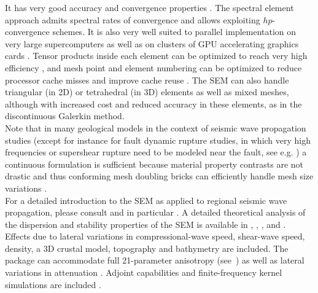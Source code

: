 It has very good accuracy and convergence properties \citep{MaPa89,SePr94,DeFiMu02,Coh02,DeSe07,SeOl08,AiWa09,AiWa10,MeStTh12}.
The spectral element approach admits spectral rates of convergence
and allows exploiting $hp$-convergence schemes. It is also very well
suited to parallel implementation on very large supercomputers \citep{KoTsChTr03,TsKoChTr03,KoLaMi08a,CaKoLaTiMiLeSnTr08,KoViCh10}
as well as on clusters of GPU accelerating graphics cards \citep{Kom11,MiKo10,KoMiEr09,KoErGoMi10}.
Tensor products inside each element can be optimized to reach very
high efficiency \citep{DeFiMu02}, and mesh point and element numbering
can be optimized to reduce processor cache misses and improve cache
reuse \citep{KoLaMi08a}. The SEM can also handle triangular (in 2D)
or tetrahedral (in 3D) elements \citep{WinBoyd96,TaWi00,KoMaTrTaWi01,Coh02,MeViSa06}
as well as mixed meshes, although with increased cost and reduced
accuracy in these elements, as in the discontinuous Galerkin method.\\


Note that in many geological models in the context of seismic wave
propagation studies (except for instance for fault dynamic rupture
studies, in which very high frequencies or supershear rupture need
to be modeled near the fault, see e.g. \citet{BeGlCrViPi07,BeGlCrVi09,PuAmKa09,TaCrEtViBeSa10})
a continuous formulation is sufficient because material property contrasts
are not drastic and thus conforming mesh doubling bricks can efficiently
handle mesh size variations \citep{KoTr02a,KoLiTrSuStSh04,LeChLiKoHuTr08,LeChKoHuTr09,LeKoHuTr09}.\\


For a detailed introduction to the SEM as applied to regional seismic
wave propagation, please consult \citet{PeKoLuMaLeCaLeMaLiBlNiBaTr11,TrKoLi08,KoVi98,KoTr99,ChKoViCaVaFe07}
and in particular \citet{LeKoHuTr09,LeChKoHuTr09,LeChLiKoHuTr08,GoAmTaCaSmSaMaKo09,WiKoScTr04,KoLiTrSuStSh04}.
A detailed theoretical analysis of the dispersion
and stability properties of the SEM is available in \citet{Coh02}, \citet{DeSe07}, \citet{SeOl07}, \citet{SeOl08} and \citet{MeStTh12}.\\


Effects due to lateral variations in compressional-wave speed, shear-wave
speed, density, a 3D crustal model, topography and bathymetry are
included. The package can accommodate full 21-parameter anisotropy
(see~\citet{ChTr07}) as well as lateral variations in attenuation
\citep{SaKoTr10}. Adjoint capabilities and finite-frequency kernel
simulations are included \citep{TrKoLi08,PeKoLuMaLeCaLeMaLiBlNiBaTr11,LiTr06,FiIgBuKe09,ViOp09}.\\


